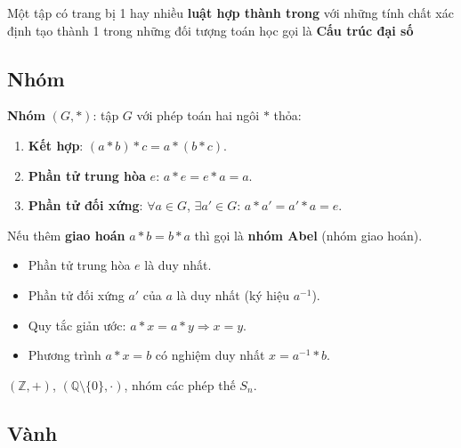 \documentclass[12pt,a4paper]{article}
\begin{document}
\begin{dinhnghia}
    Một tập có trang bị 1 hay nhiều \textbf{luật hợp thành trong} với những tính chất xác định tạo thành 1 trong những đối tượng toán học gọi là \textbf{Cấu trúc đại số}
\end{dinhnghia}

\subsection{Nhóm}

\begin{dinhnghia}
  \textbf{Nhóm} $(G, *)$: tập $G$ với phép toán hai ngôi $*$ thỏa:
  \begin{enumerate}
    \item \textbf{Kết hợp}: $(a * b) * c = a * (b * c)$.
    \item \textbf{Phần tử trung hòa} $e$: $a * e = e * a = a$.
    \item \textbf{Phần tử đối xứng}: $\forall a \in G$, $\exists a' \in G$: $a * a' = a' * a = e$.
  \end{enumerate}
  Nếu thêm \textbf{giao hoán} $a * b = b * a$ thì gọi là \textbf{nhóm Abel} (nhóm giao hoán).
\end{dinhnghia}

\begin{tinhchat}[title={Tính chất của nhóm}]
  \begin{itemize}
    \item Phần tử trung hòa $e$ là duy nhất.
    \item Phần tử đối xứng $a'$ của $a$ là duy nhất (ký hiệu $a^{-1}$).
    \item Quy tắc giản ước: $a * x = a * y \Rightarrow x = y$.
    \item Phương trình $a * x = b$ có nghiệm duy nhất $x = a^{-1} * b$.
  \end{itemize}
\end{tinhchat}

\begin{vidu}
  $(\mathbb{Z}, +)$, $(\mathbb{Q} \setminus \{0\}, \cdot)$, nhóm các phép thế $S_n$.
\end{vidu}

\subsection{Vành}
\end{document}

